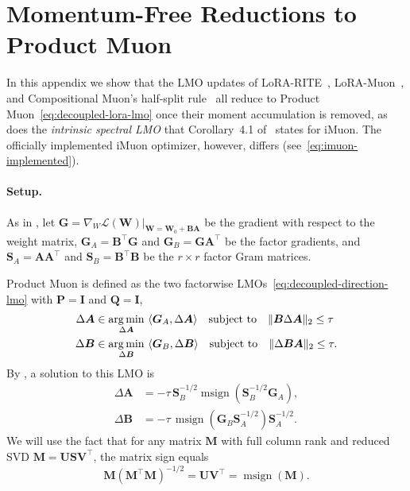 \documentclass{article}
\newcommand{\mat}[1]{\bm{#1}}
\DeclareMathOperator*{\argmin}{arg\,min}
\newcommand{\ip}[1]{\langle #1 \rangle}
\DeclareMathOperator{\msign}{msign}          %
\newcommand{\norm}[1]{\| #1\|}
\begin{document}
\section{Momentum-Free Reductions to Product Muon}
\label{app:memoryless}
In this appendix we show that the LMO updates of LoRA-RITE~\cite{lorarite}, LoRA-Muon~\cite{loramuon}, and Compositional Muon's half-split rule~\cite{tilde_csd} all reduce to Product Muon~\eqref{eq:decoupled-lora-lmo} once their moment accumulation is removed, as does the \emph{intrinsic spectral LMO} that Corollary~4.1 of~\cite{imuon} states for iMuon. The officially implemented iMuon optimizer, however, differs (see~\eqref{eq:imuon-implemented}).


\paragraph{Setup.} As in , 
let $\mat{G}=\nabla_W \mathcal{L}(\mat{W}) \big |_{\mat{W}=\mat{W}_0+\mat{B}\mat{A}}$ be the gradient with respect to the weight matrix, $\mat{G}_A=\mat{B}^\top \mat{G}$ and $\mat{G}_B=\mat{G}\mat{A}^\top$ be the factor gradients, 
and $\mat{S}_A=\mat{A}\mat{A}^\top$ and
$\mat{S}_B=\mat{B}^\top \mat{B}$ be the $r\times r$ factor Gram matrices.

Product Muon is defined as the two factorwise LMOs~\eqref{eq:decoupled-direction-lmo} 
with $\mat{P}=\mat{I}$ and $\mat{Q}=\mat{I}$,
\begin{equation}
  \begin{aligned}
  \Delta\mat{A} &\in    \argmin_{\Delta\mat{A}}~ \ip{\mat{G}_A, \Delta\mat{A}} \quad \textnormal{subject to}\quad
\norm{\mat{B} \Delta\mat{A}}_2\le\tau \\
\Delta\mat{B} &\in   \argmin_{\Delta\mat{B}}~ \ip{\mat{G}_B,  \Delta\mat{B}} \quad \textnormal{subject to}\quad  \norm{\Delta\mat{B} \mat{A}}_2\le\tau.
  \end{aligned}
  \label{eq:decoupled-lora-lmo}
\end{equation}
By , a solution to this LMO is
\begin{equation}
\begin{aligned}
\Delta\mat{A}
&=-\tau\,\mat{S}_B^{-1/2}
\msign\!\left(\mat{S}_B^{-1/2}\mat{G}_A\right),\\
\Delta\mat{B}
&=-\tau\,\msign\!\left(\mat{G}_B\mat{S}_A^{-1/2}\right)
\mat{S}_A^{-1/2}.
\end{aligned}
\label{eq:product-muon-step}
\end{equation}
We will use the fact that for any matrix $\mat{M}$ with full column rank and reduced SVD $\mat{M}=\mat{U}\mat{S} \mat{V}^\top$,
the matrix sign equals
\begin{equation}
  \mat{M}(\mat{M}^\top \mat{M})^{-1/2}=
  \mat{U}\mat{V}^\top=\msign(\mat{M}).
  \label{eq:polar-id}
\end{equation}
\end{document}

